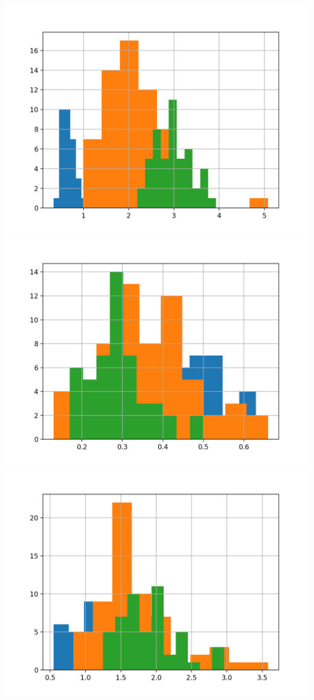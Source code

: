 \documentclass{article}
\begin{document}
\includegraphics[width=\textwidth]{v7.png}\\
\includegraphics[width=\textwidth]{v8.png}\\
\includegraphics[width=\textwidth]{v9.png}\\
\end{document}

